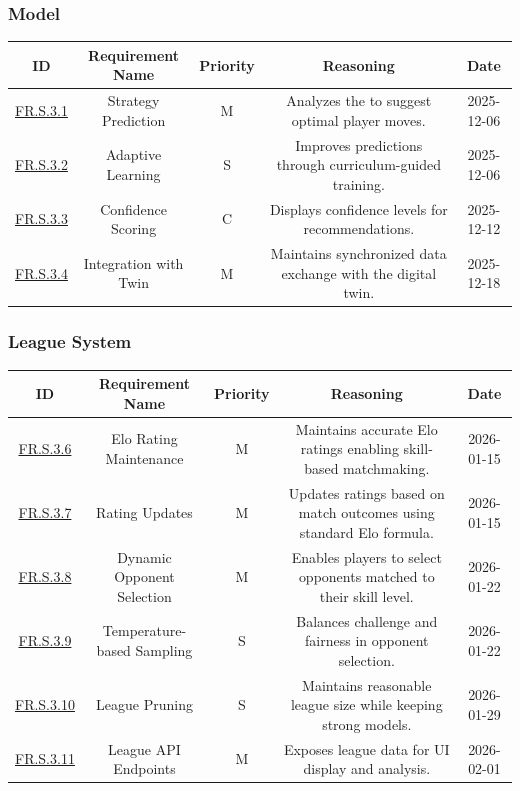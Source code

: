 \documentclass{article}
\begin{document}
\subsubsection*{\AI{} Model}

\begin{tabular}{|c|c|c|c|c|}
\hline
\textbf{ID} & \textbf{Requirement Name} & \textbf{Priority} &
\textbf{Reasoning} & \textbf{Date} \\
\hline
\hyperref[FR.S.3.1]{FR.S.3.1} & Strategy Prediction & M &
\parbox[t]{4cm}{Analyzes the \GameState{} to suggest optimal player moves.} &
2025-12-06 \\
\hline
\hyperref[FR.S.3.2]{FR.S.3.2} & Adaptive Learning & S &
\parbox[t]{4cm}{Improves predictions through curriculum-guided training.} &
2025-12-06 \\
\hline
\hyperref[FR.S.3.3]{FR.S.3.3} & Confidence Scoring & C &
\parbox[t]{4cm}{Displays confidence levels for \AI{} recommendations.} &
2025-12-12 \\
\hline
\hyperref[FR.S.3.4]{FR.S.3.4} & Integration with Twin & M &
\parbox[t]{4cm}{Maintains synchronized data exchange with the digital twin.} &
2025-12-18 \\
\hline
\end{tabular}

\vspace{1em}

\subsubsection*{\Elo{} League System}

\begin{tabular}{|c|c|c|c|c|}
\hline
\textbf{ID} & \textbf{Requirement Name} & \textbf{Priority} &
\textbf{Reasoning} & \textbf{Date} \\
\hline
\hyperref[FR.S.3.6]{FR.S.3.6} & Elo Rating Maintenance & M &
\parbox[t]{4cm}{Maintains accurate Elo ratings enabling skill-based matchmaking.} &
2026-01-15 \\
\hline
\hyperref[FR.S.3.7]{FR.S.3.7} & Rating Updates & M &
\parbox[t]{4cm}{Updates ratings based on match outcomes using standard Elo formula.} &
2026-01-15 \\
\hline
\hyperref[FR.S.3.8]{FR.S.3.8} & Dynamic Opponent Selection & M &
\parbox[t]{4cm}{Enables players to select opponents matched to their skill level.} &
2026-01-22 \\
\hline
\hyperref[FR.S.3.9]{FR.S.3.9} & Temperature-based Sampling & S &
\parbox[t]{4cm}{Balances challenge and fairness in opponent selection.} &
2026-01-22 \\
\hline
\hyperref[FR.S.3.10]{FR.S.3.10} & League Pruning & S &
\parbox[t]{4cm}{Maintains reasonable league size while keeping strong models.} &
2026-01-29 \\
\hline
\hyperref[FR.S.3.11]{FR.S.3.11} & League API Endpoints & M &
\parbox[t]{4cm}{Exposes league data for UI display and analysis.} &
2026-02-01 \\
\hline
\end{tabular}
\end{document}
